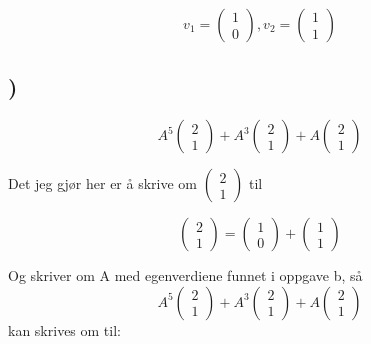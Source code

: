 \documentclass[a4paper,10pt,norsk]{article}
\begin{document}
\[v_{1} = \left(\begin{matrix} 1\\0 \end{matrix}\right), v_{2} = \left(\begin{matrix} 1\\1 \end{matrix}\right)\]

\subsection{)}

\[A^{5}\left(\begin{matrix} 2\\1 \end{matrix}\right) + A^{3}\left(\begin{matrix} 2\\1 \end{matrix}\right) + A\left(\begin{matrix} 2\\1 \end{matrix}\right)\]

Det jeg gjør her er å skrive om $\left(\begin{matrix} 2\\1 \end{matrix}\right)$ til 

\[\left(\begin{matrix} 2\\1 \end{matrix}\right) = \left(\begin{matrix} 1\\0 \end{matrix}\right) + \left(\begin{matrix} 1\\1 \end{matrix}\right)\]

Og skriver om A med egenverdiene funnet i oppgave b,  så
\[A^{5}\left(\begin{matrix} 2\\1 \end{matrix}\right) + A^{3}\left(\begin{matrix} 2\\1 \end{matrix}\right) + A\left(\begin{matrix} 2\\1 \end{matrix}\right)\]
kan skrives om til:
\end{document}
